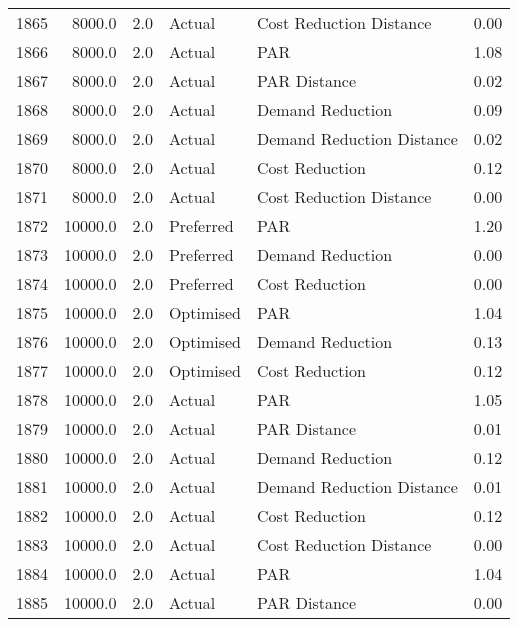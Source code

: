 \begin{longtable}{lrrllr}
1865 &       8000.0 &     2.0 &         Actual &    Cost Reduction Distance &   0.00 \\
1866 &       8000.0 &     2.0 &         Actual &                        PAR &   1.08 \\
1867 &       8000.0 &     2.0 &         Actual &               PAR Distance &   0.02 \\
1868 &       8000.0 &     2.0 &         Actual &           Demand Reduction &   0.09 \\
1869 &       8000.0 &     2.0 &         Actual &  Demand Reduction Distance &   0.02 \\
1870 &       8000.0 &     2.0 &         Actual &             Cost Reduction &   0.12 \\
1871 &       8000.0 &     2.0 &         Actual &    Cost Reduction Distance &   0.00 \\
1872 &      10000.0 &     2.0 &      Preferred &                        PAR &   1.20 \\
1873 &      10000.0 &     2.0 &      Preferred &           Demand Reduction &   0.00 \\
1874 &      10000.0 &     2.0 &      Preferred &             Cost Reduction &   0.00 \\
1875 &      10000.0 &     2.0 &      Optimised &                        PAR &   1.04 \\
1876 &      10000.0 &     2.0 &      Optimised &           Demand Reduction &   0.13 \\
1877 &      10000.0 &     2.0 &      Optimised &             Cost Reduction &   0.12 \\
1878 &      10000.0 &     2.0 &         Actual &                        PAR &   1.05 \\
1879 &      10000.0 &     2.0 &         Actual &               PAR Distance &   0.01 \\
1880 &      10000.0 &     2.0 &         Actual &           Demand Reduction &   0.12 \\
1881 &      10000.0 &     2.0 &         Actual &  Demand Reduction Distance &   0.01 \\
1882 &      10000.0 &     2.0 &         Actual &             Cost Reduction &   0.12 \\
1883 &      10000.0 &     2.0 &         Actual &    Cost Reduction Distance &   0.00 \\
1884 &      10000.0 &     2.0 &         Actual &                        PAR &   1.04 \\
1885 &      10000.0 &     2.0 &         Actual &               PAR Distance &   0.00 \\

\end{longtable}

